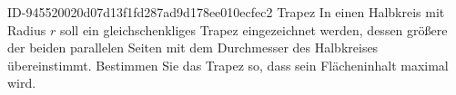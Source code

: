 \begin{exercise}
      {ID-945520020d07d13f1fd287ad9d178ee010ecfec2}
      {Trapez}
  \ifproblem\problem
    In einen Halbkreis mit Radius $r$ soll ein gleichschenkliges Trapez
    eingezeichnet werden, dessen größere der beiden parallelen Seiten
    mit dem Durchmesser des Halbkreises übereinstimmt. Bestimmen
    Sie das Trapez so, dass sein Flächeninhalt maximal wird.
  \fi
\end{exercise}
